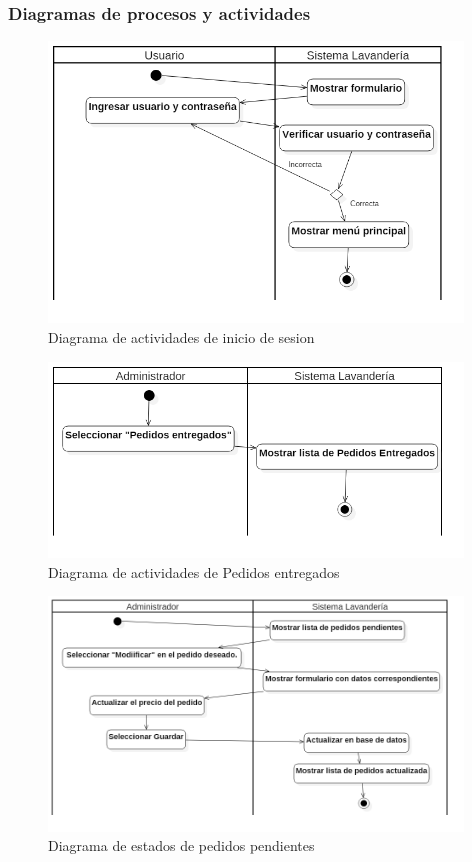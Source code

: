 \newpage

\subsubsection{Diagramas de procesos y actividades}


\begin{figure}[htb]
\begin{center}
\includegraphics[width=11cm]{./imagenes/diagramas/Actividades_Lavanderia_InicioSesion.png}
\end{center}
\caption{Diagrama de actividades de inicio de sesion}
\end{figure}

\begin{figure}[htb]
\begin{center}
\includegraphics[width=11cm]{./imagenes/diagramas/Actividades_Lavanderia_PedidosEntregados.png}
\end{center}
\caption{Diagrama de actividades de Pedidos entregados}
\end{figure}

\begin{figure}[htb]
\begin{center}
\includegraphics[width=11cm]{./imagenes/diagramas/Actividades_Lavanderia_PedidosPendientes.png}
\end{center}
\caption{Diagrama de estados de pedidos pendientes}
\end{figure}


